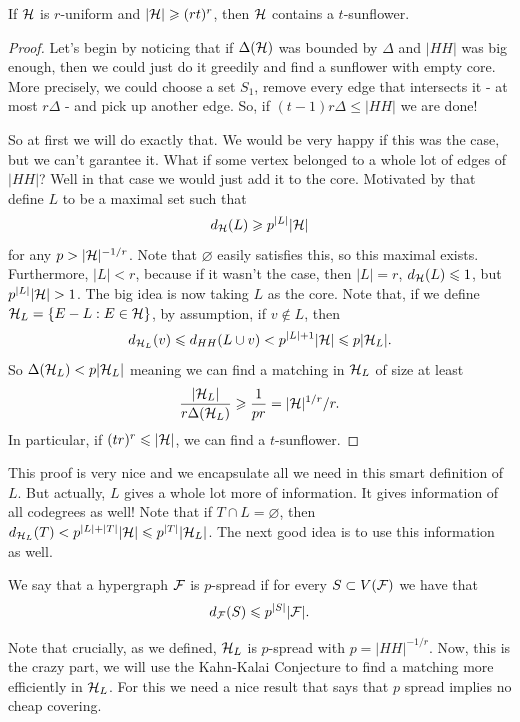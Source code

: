 \begin{theorem}
	If $\mathcal{H}$ is $r$-uniform and $|\mathcal{H}| \geqslant (rt)^r$, then $\mathcal{H}$ contains
	a $t$-sunflower.
\end{theorem}
\begin{proof}
	Let's begin by noticing that if $\Delta(\mathcal{H})$ was bounded by
	$\Delta$ and $|HH|$ was big
	enough, then we could just do it greedily and find a sunflower with
	empty core. More precisely,
	we could choose a set $S_1$, remove every edge that intersects it -
	at most $r\Delta$ -
	and pick up another edge. So, if $(t-1)r\Delta \leq |HH|$ we are done!

	So at first we will do exactly that. We would be very happy if this
	was the case, but
	we can't garantee it. What if some vertex belonged to a whole lot of
	edges of $|HH|$?
	Well in that case we would just add it to the core. Motivated by
	that define $L$ to be a
	maximal set such that
	\[
		d_{\mathcal{H}}(L) \geqslant p^{|L|}|\mathcal{H}|
	\]
	for any $p > |\mathcal{H}|^{-1/r}$. Note that $\varnothing$ easily satisfies
	this, so this maximal exists.
	Furthermore, $|L| < r$, because if it wasn't the case, then $|L| =
	r$, $d_{\mathcal{H}}(L) \leqslant 1$,
	but $p^{|L|}|\mathcal{H}| > 1$. The big idea is now taking $L$ as the core. Note that,
	if we define $\mathcal{H}_L = \{E - L : E \in \mathcal{H}\}$, by assumption, if $v \not \in L$,
	then
	\[
		d_{\mathcal{H}_L}(v) \leqslant d_{HH}(L \cup {v}) < p^{|L|+1}|\mathcal{H}| \leqslant p|\mathcal{H}_L|.
	\]
	So $\Delta(\mathcal{H}_L) < p|\mathcal{H}_L|$ meaning we can find a matching in $\mathcal{H}_L$ of size
	at least
	\[
		\frac{|\mathcal{H}_L|}{r\Delta(\mathcal{H}_L)} \geqslant \frac{1}{pr} = |\mathcal{H}|^{1/r}/r.
	\]
	In particular, if $(tr)^r \leqslant |\mathcal{H}|$, we can find a $t$-sunflower.
\end{proof}
\begin{remark}
	This proof is very nice and we encapsulate all we need in this smart
	definition of $L$.
	But actually, $L$ gives a whole lot more of information. It gives
	information of all codegrees as well!
	Note that if $T \cap L = \varnothing$, then $d_{\mathcal{H}_L}(T) < p^{|L| +
	|T|}|\mathcal{H}| \leqslant p^{|T|}|\mathcal{H}_L|$.
	The next good idea is to use this information as well.
\end{remark}

\begin{definition}
	We say that a hypergraph $\mathcal{F}$ is $p$-spread if for every $S \subset
	V(\mathcal{F})$ we have that
	\[
		d_{\mathcal{F}}(S) \leqslant p^{|S|}|\mathcal{F}|.
	\]
\end{definition}

Note that crucially, as we defined, $\mathcal{H}_L$ is $p$-spread with $p =
|HH|^{-1/r}$.
Now, this is the crazy part, we will use the Kahn-Kalai Conjecture to
find a matching
more efficiently in $\mathcal{H}_{L}$. For this we need a nice result that says that $p$
spread implies no cheap covering.

